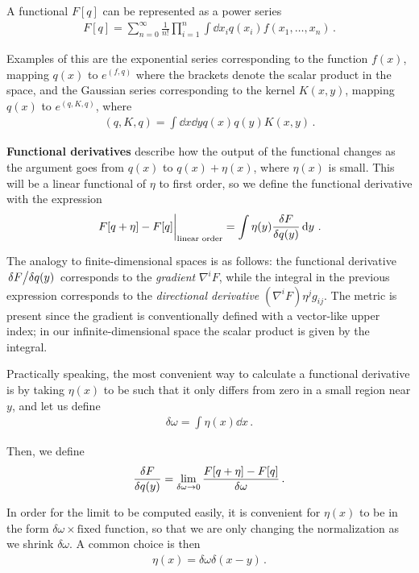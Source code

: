 \documentclass[main.tex]{subfiles}
\begin{document}
A functional \(F[q]\) can be represented as a power series 
%
\begin{align}
F[q] = \sum _{n=0}^{\infty } \frac{1}{n!} \prod_{i=1}^{n} \int \dd{x_i} q(x_i) f(x_1, \dots, x_n)
\,.
\end{align}

Examples of this are the exponential series corresponding to the function \(f(x)\), mapping \(q(x)\) to \(e^{(f, q)}\) where the brackets denote the scalar product in the space, and the Gaussian series corresponding to the kernel \(K(x, y)\), mapping \(q(x)\) to \(e^{(q, K, q)}\), where 
%
\begin{align}
(q, K, q) = \int \dd{x} \dd{y} q(x) q(y) K(x, y)
\,.
\end{align}

\textbf{Functional derivatives} describe how the output of the functional changes as the argument goes from \(q(x)\) to \(q(x) + \eta (x)\), where \(\eta (x)\) is small. 
This will be a linear functional of \(\eta \) to first order, so we define the functional derivative with the expression 
%
\begin{align}
\eval{F[q+\eta ] - F[q]}_{\text{linear order}} = \int \eta (y) \fdv{F}{q (y)} \dd{y}
\,.
\end{align}

The analogy to finite-dimensional spaces is as follows: the functional derivative \(\fdv*{F}{q(y)}\) corresponds to the \emph{gradient} \(\nabla^{i} F\), while the integral in the previous expression corresponds to the \emph{directional derivative} \((\nabla^{i} F) \eta^{j} g_{ij}\).
The metric is present since the gradient is conventionally defined with a vector-like upper index; in our infinite-dimensional space the scalar product is given by the integral.

Practically speaking, the most convenient way to calculate a functional derivative is by taking \(\eta (x)\) to be such that it only differs from zero in a small region near \(y\), and let us define 
%
\begin{align}
\delta \omega = \int \eta (x) \dd{x}
\,.
\end{align}

Then, we define 
%
\begin{align}
\fdv{F}{q(y)} = \lim_{ \delta \omega \to 0} \frac{F[q + \eta ] - F[q]}{ \delta \omega }
\,.
\end{align}

In order for the limit to be computed easily, it is convenient for \(\eta (x)\) to be in the form \(\delta \omega \times \text{fixed function}\),
so that we are only changing the normalization as we shrink \(\delta \omega \).
A common choice is then 
%
\begin{align}
\eta (x) = \delta \omega  \delta (x-y)
\,.
\end{align}
\end{document}
